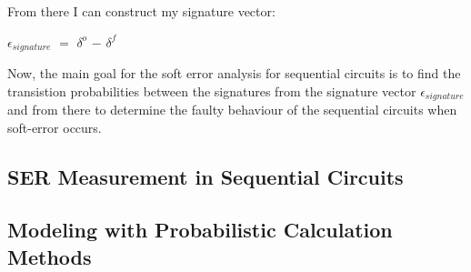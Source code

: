 From there I can construct my signature vector:


$\epsilon_{signature}$ $=$ $\delta^{o}$  $-$ $\delta^{f}$


Now, the main goal for the soft error analysis for sequential circuits is to find the transistion probabilities between the signatures from the signature vector $\epsilon_{signature}$ and from there to determine the faulty behaviour of the sequential circuits when soft-error occurs. 

\subsection{SER Measurement in Sequential Circuits}

\subsection{Modeling with Probabilistic Calculation Methods}




